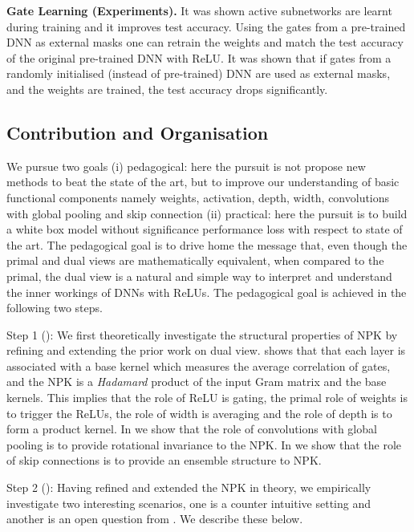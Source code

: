 \documentclass{article} %
\begin{document}
\textbf{Gate Learning (Experiments).}  It was shown active subnetworks are learnt during training and it improves test accuracy.  Using the gates from a pre-trained DNN as external masks one can retrain the weights and match the test accuracy of the original pre-trained DNN with ReLU. 
It was shown that if gates from a randomly initialised (instead of pre-trained) DNN are used as external masks, and the weights are trained, the test accuracy drops significantly. 

\subsection{Contribution and Organisation}
 
We pursue two goals (i) pedagogical: here the pursuit is not propose new methods to beat the state of the art, but to improve our understanding of basic functional components namely weights, activation, depth, width, convolutions with global pooling  and skip connection (ii) practical: here the pursuit is to build a white box model without significance performance loss with respect to state of the art. The pedagogical goal is to drive home the message that, even though the primal and dual views are mathematically equivalent, when compared to the primal, the dual view is a natural and simple way to interpret and understand the inner workings of DNNs with ReLUs. The pedagogical goal is achieved in the following two steps. 

Step 1 (): We first theoretically investigate the structural properties of NPK by refining and extending the prior work on dual view.  shows that that each layer is associated with a base kernel which measures the average correlation of gates, and the NPK is a \emph{Hadamard} product of the input Gram matrix and the base kernels. This implies that the role of ReLU is gating, the primal role of weights is to trigger the ReLUs, the role of width is averaging and the role of depth is to form a product kernel. In  we show that the role of convolutions with global pooling is to provide rotational invariance to the NPK. In  we show that the role of skip connections is to provide an ensemble structure to NPK.

Step 2  (): Having refined and extended the NPK in theory, we empirically investigate two interesting scenarios, one is a counter intuitive setting and another is an open question from \cite{randlabel}. We describe these below.
\end{document}
